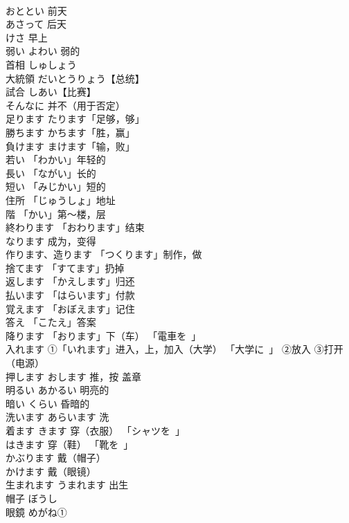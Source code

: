 \documentclass[8pt]{extreport}
\begin{document}
\begin{CJK}{UTF8}{min}
\\	おととい	前天
\\	あさって	后天
\\	けさ	早上
\\	弱い	よわい 弱的
\\	首相	しゅしょう
\\	大統領	だいとうりょう【总统】	
\\	試合	しあい【比赛】	
\\	そんなに	并不（用于否定）	
\\	足ります	たります「足够，够」	
\\	勝ちます	かちます「胜，赢」	
\\	負けます	まけます「输，败」	
\\	若い	「わかい」年轻的	
\\	長い	「ながい」长的	
\\	短い	「みじかい」短的	
\\	住所	「じゅうしょ」地址	
\\	階	「かい」第～楼，层	
\\	終わります	「おわります」结束	
\\	なります	成为，变得	
\\	作ります、造ります	「つくります」制作，做	
\\	捨てます	「すてます」扔掉	
\\	返します	「かえします」归还	
\\	払います	「はらいます」付款	
\\	覚えます	「おぼえます」记住	
\\	答え	「こたえ」答案	
\\	降ります	「おります」下（车） 「電車を~」	
\\	入れます	①「いれます」进入，上，加入（大学） 「大学に~」 ②放入 ③打开（电源）	
\\	押します	おします 推，按 盖章	
\\	明るい	あかるい 明亮的	
\\	暗い	くらい 昏暗的	
\\	洗います	あらいます 洗	
\\	着ます	きます 穿（衣服） 「シャツを~」	
\\	はきます	穿（鞋） 「靴を~」	
\\	かぶります	戴（帽子）	
\\	かけます	戴（眼镜）	
\\	生まれます	うまれます 出生	
\\	帽子	ぼうし	
\\	眼鏡	めがね①	

\end{CJK}
\end{document}

